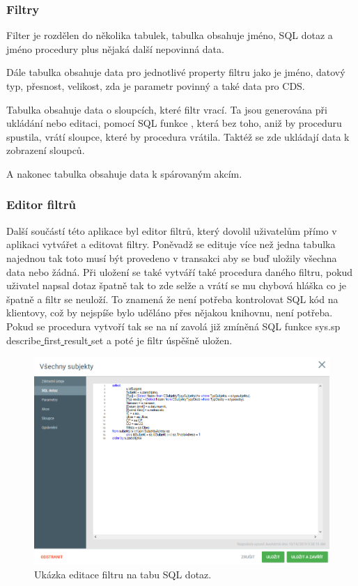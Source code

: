 \documentclass[czech,bachelor,dept460,male,csharp]{diploma}
\newcommand{\un}{\underline{ }}
\begin{document}
		\subsubsection{Filtry}
			Filter je rozdělen do několika tabulek, tabulka  obsahuje jméno, SQL dotaz a jméno procedury plus nějaká další nepovinná data. 
			
			Dále tabulka  obsahuje data pro jednotlivé property filtru jako je jméno, datový typ, přesnost, velikost, zda je parametr povinný a také data pro CDS. 
			
			Tabulka  obsahuje data o sloupcích, které filtr vrací. Ta jsou generována při ukládání nebo editaci, pomocí SQL funkce \uv{sys.sp{\un}describe{\un}first{\un}result{\un}set}, která bez toho, aniž by proceduru spustila, vrátí sloupce, které by procedura vrátila. Taktéž se zde ukládají data k zobrazení sloupců. 
			
			A nakonec tabulka  obsahuje data k spárovaným akcím.
	
		\subsubsection{Editor filtrů}
			Další součástí této aplikace byl editor filtrů, který dovolil uživatelům přímo v aplikaci vytvářet a editovat filtry. Poněvadž se edituje více než jedna tabulka najednou tak toto musí být provedeno v transakci aby se buď uložily všechna data nebo žádná. Při uložení se také vytváří také procedura daného filtru, pokud uživatel napsal dotaz špatně tak to zde selže a vrátí se mu chybová hláška co je špatně a filtr se neuloží. To znamená že není potřeba kontrolovat SQL kód na klientovy, což by nejspíše bylo uděláno přes nějakou knihovnu, není potřeba. Pokud se procedura vytvoří tak se na ní zavolá již zmíněná SQL funkce sys.sp{\un}describe{\un}first{\un}result{\un}set a poté je filtr úspěšně uložen.
			\begin{figure}[h]
				\includegraphics[width=1.0\textwidth]{Figures/Edit.png}
				\caption{Ukázka editace filtru na tabu SQL dotaz.}
    			\label{fig:Editimg}
			\end{figure}
\end{document}
